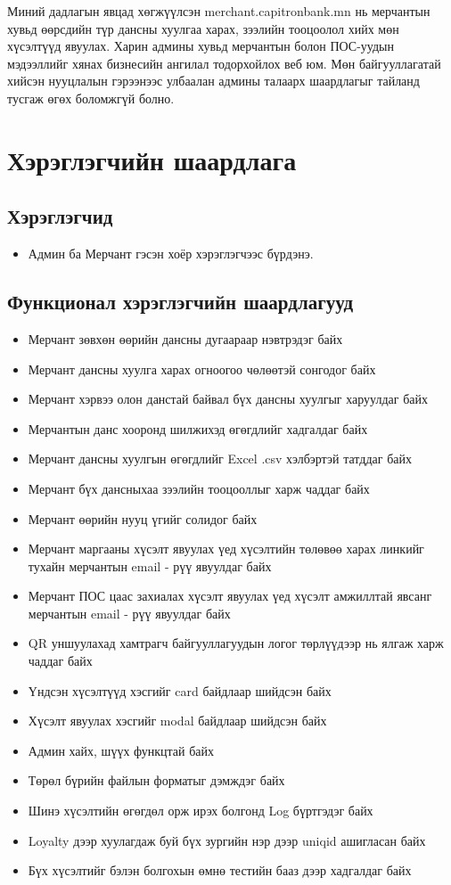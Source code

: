 \quad \quad Миний дадлагын явцад хөгжүүлсэн merchant.capitronbank.mn нь мерчантын хувьд өөрсдийн түр дансны хуулгаа харах, зээлийн тооцоолол хийх мөн хүсэлтүүд явуулах. Харин админы хувьд мерчантын болон ПОС-уудын мэдээллийг хянах бизнесийн ангилал тодорхойлох веб юм. Мөн байгууллагатай хийсэн нууцлалын гэрээнээс улбаалан админы талаарх шаардлагыг тайланд тусгаж өгөх боломжгүй болно.
\section{Хэрэглэгчийн шаардлага}
  \subsection{Хэрэглэгчид}
    \begin{itemize}
        \item Админ ба Мерчант гэсэн хоёр хэрэглэгчээс бүрдэнэ.
    \end{itemize}
	\subsection{Функционал хэрэглэгчийн шаардлагууд}
     \begin{itemize}
        \item Мерчант зөвхөн өөрийн дансны дугаараар нэвтрэдэг байх
        \item Мерчант дансны хуулга харах огноогоо чөлөөтэй сонгодог байх
        \item Мерчант хэрвээ олон данстай байвал бүх дансны хуулгыг харуулдаг байх
        \item Мерчантын данс хооронд шилжихэд өгөгдлийг хадгалдаг байх
        \item Мерчант дансны хуулгын өгөгдлийг Excel .csv хэлбэртэй татддаг байх 
        \item Мерчант бүх дансныхаа зээлийн тооцооллыг харж чаддаг байх
        \item Мерчант өөрийн нууц үгийг солидог байх
        \item Мерчант маргааны хүсэлт явуулах үед хүсэлтийн төлөвөө харах линкийг тухайн мерчантын email - рүү явуулдаг байх
        \item Мерчант ПОС цаас захиалах хүсэлт явуулах үед хүсэлт амжиллтай явсанг мерчантын email - рүү явуулдаг байх
        \item QR уншуулахад хамтрагч байгууллагуудын логог төрлүүдээр нь ялгаж харж чаддаг байх
        \item Үндсэн хүсэлтүүд хэсгийг card байдлаар шийдсэн байх
        \item Хүсэлт явуулах хэсгийг modal байдлаар шийдсэн байх
        \item Админ хайх, шүүх функцтай байх
        \item Төрөл бүрийн файлын форматыг дэмждэг байх
        \item Шинэ хүсэлтийн өгөгдөл орж ирэх болгонд Log бүртгэдэг байх
        \item Loyalty дээр хуулагдаж буй бүх зургийн нэр дээр uniqid ашигласан байх
        \item Бүх хүсэлтийг бэлэн болгохын өмнө тестийн бааз дээр хадгалдаг байх
    \end{itemize}
